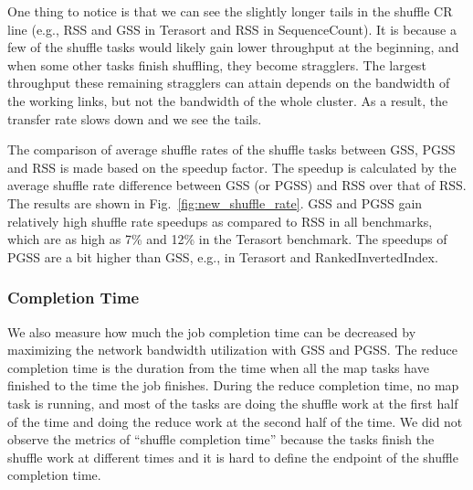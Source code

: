 \documentclass[10pt,journal,compsoc]{IEEEtran}
\begin{document}
One thing to notice is that we can see the slightly longer tails in the shuffle CR line (e.g., RSS and GSS in Terasort and RSS in SequenceCount). 
It is because a few of the shuffle tasks would likely gain lower throughput at the beginning, and when some other tasks finish shuffling, they become stragglers. The largest throughput these remaining stragglers can attain depends on the bandwidth of the working links, but not the bandwidth of the whole cluster. As a result, the transfer rate slows down and we see the tails.

The comparison of average shuffle rates of the shuffle tasks between GSS, PGSS and RSS is made based on the speedup factor. 
The speedup is calculated by the average shuffle rate difference between GSS (or PGSS) and RSS over that of RSS. 
The results are shown in Fig.~\ref{fig:new_shuffle_rate}.
GSS and PGSS gain relatively high shuffle rate speedups as compared to
RSS in all benchmarks, which are as high as 7\% and 12\% in the
Terasort benchmark.
The speedups of PGSS are a bit higher than GSS, e.g., in Terasort and RankedInvertedIndex. 



\subsubsection{Completion Time}
We also measure how much the job completion time can be decreased by maximizing the network bandwidth utilization with GSS and PGSS. 
The reduce completion time is the duration from the time when all the
map tasks have finished to the time the job finishes.
During the reduce completion time, no map task is running, and most of
the tasks are doing the shuffle work at the first half of the time and
doing the reduce work at the second half of the time.
We did not observe the metrics of ``shuffle completion time'' because
the tasks finish the shuffle work at different times and it is hard to
define the endpoint of the shuffle completion time.
\end{document}
